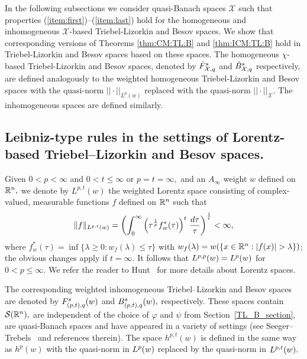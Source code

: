In the following subsections we consider quasi-Banach spaces $\mathcal{X}$ such that properties (\ref{item:first})--(\ref{item:last}) hold for the homogeneous and inhomogeneous $\mathcal{X}$-based Triebel-Lizorkin and Besov spaces. We show that corresponding versions of Theorems \ref{thm:CM:TL:B} and \ref{thm:ICM:TL:B} hold in Triebel-Lizorkin and Besov spaces based on these spaces. The homogeneous $\chi$-based Triebel-Lizorkin and Besov spaces, denoted by $\tl{\mathcal{X}}{s}{q}$ and $\bes{\mathcal{X}}{s}{q}$ respectively, are defined analogously to the weighted homogeneous Triebel-Lizorkin and Besov spaces with the quasi-norm $||\cdot||_{L^p(w)}$ replaced with the quasi-norm $||\cdot||_\mathcal{X}$. The inhomogeneous spaces are defined similarly. 


\subsection{Leibniz-type rules in the settings of Lorentz-based Triebel--Lizorkin and Besov spaces.}

Given $0<p<\infty$ and $0<t\le \infty$ or $p=t=\infty,$ and an $A_\infty$ weight $w$ defined on $\rn,$  we denote by $L^{p,t}(w)$ the weighted Lorentz space consisting of complex-valued, measurable functions $f$ defined on $\rn$ such that
\[
\|f\|_{\lebw{p,t}{w}}=\left(\int_0^\infty \left(\tau^{\frac{1}{p}} f_w^*(\tau)\right)^t\,\frac{d\tau}{\tau}\right)^{\frac{1}{t}}<\infty,
\]
where $f^*_w(\tau)=\inf\{\lambda\ge 0:w_f(\lambda)\le \tau\}$ with
$w_f(\lambda)=w(\{x\in\rn : \abs{f(x)}>\lambda\})$; the obvious changes apply if $t=\infty.$
 It follows that $\lebw{p,p}{w}=\lebw{p}{w}$ for $0<p\le \infty.$  We refer the reader to Hunt~\cite{MR0223874} for more details about Lorentz spaces. 
 
 The corresponding weighted inhomogeneous Triebel--Lizorkin and Besov spaces are denoted by $\itlw{(p,t)}{s}{q}{w}$ and  $\ibesw{(p,t)}{s}{q}{w},$  respectively. These spaces contain $\sw,$ are independent of the choice of $\varphi$ and $\psi$ from Section~\ref{TL_B_section}, are quasi-Banach spaces and have appeared in a variety of settings (see Seeger--Trebels~\cite{ST2018} and references therein). The space $h^{p,t}(w)$ is defined in the same way as $h^p(w)$ with the quasi-norm in $\lebw{p}{w}$ replaced by the quasi-norm in $\lebw{p,t}{w}.$   
 

